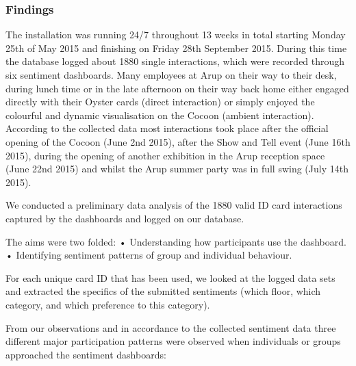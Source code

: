 \subsubsection{Findings}

The installation was running 24/7 throughout 13 weeks in total starting Monday 25th of May 2015 and finishing on Friday 28th September 2015. During this time the database logged about 1880 single interactions, which were recorded through six sentiment dashboards. Many employees at Arup on their way to their desk, during lunch time or in the late afternoon on their way back home either engaged directly with their Oyster cards (direct interaction) or simply enjoyed the colourful and dynamic visualisation on the Cocoon (ambient interaction). According to the collected data most interactions took place after the official opening of the Cocoon (June 2nd 2015), after the Show and Tell event (June 16th 2015), during the opening of another exhibition in the Arup reception space (June 22nd 2015) and whilst the Arup summer party was in full swing (July 14th 2015).

We conducted a preliminary data analysis of the 1880 valid ID card interactions captured by the dashboards and logged on our database. 

The aims were two folded:
•	Understanding how participants use the dashboard. 
•	Identifying sentiment patterns of group and individual behaviour.

For each unique card ID that has been used, we looked at the logged data sets and extracted the specifics of the submitted sentiments (which floor, which category, and which preference to this category). 

From our observations and in accordance to the collected sentiment data three different major participation patterns were observed when individuals or groups approached the sentiment dashboards: 

